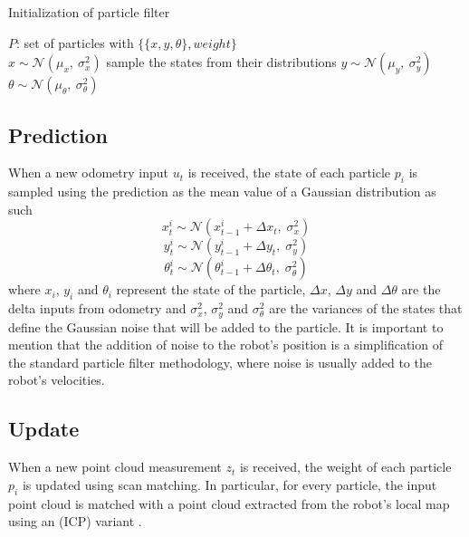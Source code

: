 \begin{algorithm}
    \caption{Initialization of particle filter}
    \label{alg:pf_initialization}
    \begin{algorithmic}[1]
        \State $P$: set of particles with $\{\{x, y, \theta\}, weight\}$ \\

            \State $x \sim \mathcal{N}(\mu_x, \ \sigma^2_x)$
            \Comment sample the states from their distributions
            \State $y \sim \mathcal{N}(\mu_y, \ \sigma^2_y)$
            \State $\theta \sim \mathcal{N}(\mu_\theta, \ \sigma^2_\theta)$
        \EndFor
    \end{algorithmic}
\end{algorithm}

\subsection{Prediction} \label{pf_prediction}

When a new odometry input $u_t$ is received, the state of each particle
$p_i$ is sampled using the prediction as the mean value of a Gaussian
distribution as such
\begin{equation}
    x^i_t \sim \mathcal{N}(x^i_{t-1} + \Delta x_t ,\; \sigma^2_x)
\end{equation}
\begin{equation}
    y^i_t \sim \mathcal{N}(y^i_{t-1} + \Delta y_t ,\; \sigma^2_y)
\end{equation}
\begin{equation}
    \theta^i_t \sim
    \mathcal{N}(\theta^i_{t-1} + \Delta \theta_t ,\; \sigma^2_\theta)
\end{equation}
where
$x_i$, $y_i$ and $\theta_i$ represent the state of the particle,
$\Delta x$, $\Delta y$ and $\Delta \theta$ are the delta inputs from odometry
and $\sigma^2_x$, $\sigma^2_y$ and $\sigma^2_\theta$ are the variances of
the states that define the Gaussian noise that will be added to the particle.
It is important to mention that the addition of noise to the robot's position
is a simplification of the standard particle filter methodology,
where noise is usually added to the robot's velocities.

\subsection{Update} \label{pf_update}

When a new point cloud measurement $z_t$ is received, the weight of each
particle $p_i$ is updated using scan matching.
In particular, for every particle, the input point cloud is matched with
a point cloud extracted from the robot's local map using
an  (ICP) variant \parencite{Zhang1994}.

